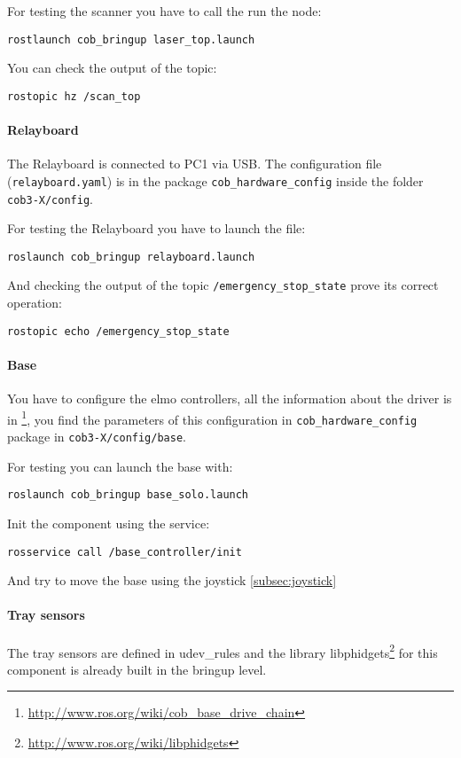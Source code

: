 For testing the scanner you have to call the run the node:
\begin{lstlisting}
rostlaunch cob_bringup laser_top.launch
\end{lstlisting}

You can check the output of the topic:
\begin{lstlisting}
rostopic hz /scan_top
\end{lstlisting}

\paragraph{Relayboard}
The Relayboard is connected to PC1 via USB. The configuration file (\texttt{relayboard.yaml}) is in the package \texttt{cob\_hardware\_config} inside the folder \texttt{cob3-X/config}.

For testing the Relayboard you have to launch the file:
\begin{lstlisting}
roslaunch cob_bringup relayboard.launch
\end{lstlisting}

And checking the output of the topic \texttt{/emergency\_stop\_state} prove its correct operation:
\begin{lstlisting}
rostopic echo /emergency_stop_state
\end{lstlisting}

\paragraph{Base}
You have to configure the elmo controllers, all the information about the driver is in \footnote{\url{http://www.ros.org/wiki/cob_base_drive_chain}}, you find the parameters of this configuration in \texttt{cob\_hardware\_config} package in \texttt{cob3-X/config/base}.

For testing you can launch the base with:
\begin{lstlisting}
roslaunch cob_bringup base_solo.launch
\end{lstlisting}
Init the component using the service:
\begin{lstlisting}
rosservice call /base_controller/init
\end{lstlisting}
And try to move the base using the joystick \ref{subsec:joystick}

\paragraph{Tray sensors}
The tray sensors are defined in udev\_rules and the library libphidgets\footnote{\url{http://www.ros.org/wiki/libphidgets}} for this component is already built in the bringup level.

